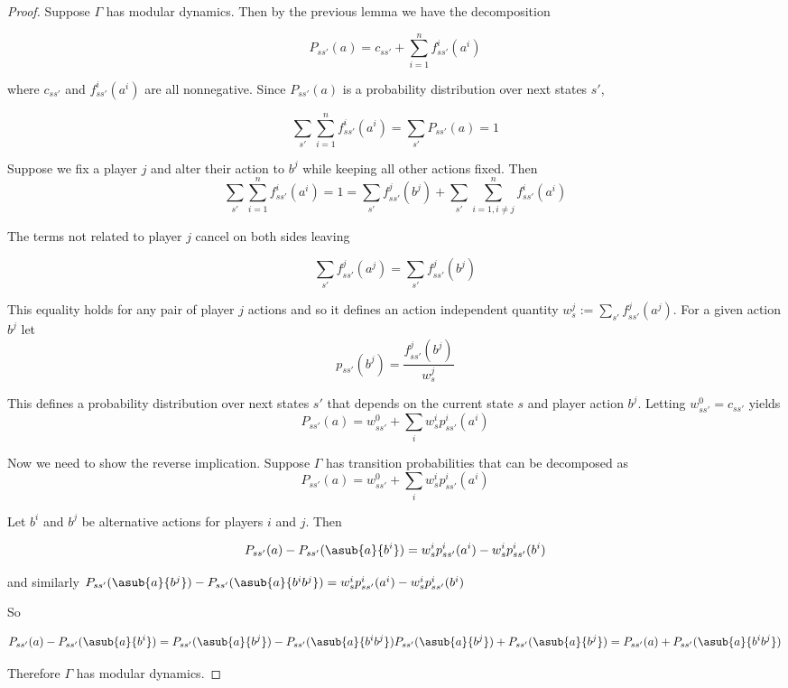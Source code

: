 \begin{proof}

Suppose $\Gamma$ has modular dynamics. Then by the previous lemma we have the decomposition

$$
P_{ss'}(a) = c_{ss'} + \sum_{i=1}^n f^i_{ss'}(a^i)
$$

where $c_{ss'}$ and $f^i_{ss'}(a^i)$ are all nonnegative. Since $P_{ss'}(a)$ is a probability distribution over next states $s'$, 

$$
\sum_{s'} \sum_{i=1}^n f^i_{ss'}(a^i) = \sum_{s'} P_{ss'}(a) = 1
$$

Suppose we fix a player $j$ and alter their action to $b^j$ while keeping all other actions fixed. Then
$$
\sum_{s'} \sum_{i=1}^n f^i_{ss'}(a^i) = 1 = \sum_{s'} f^j_{ss'}(b^j) + \sum_{s'} \sum_{i=1, i \neq j}^n f^i_{ss'}(a^i)
$$

The terms not related to player $j$ cancel on both sides leaving

$$
\sum_{s'} f^j_{ss'}(a^j) = \sum_{s'} f^j_{ss'}(b^j)
$$

This equality holds for any pair of player $j$ actions and so it defines an action independent quantity $w_{s}^j := \sum_{s'} f^j_{ss'}(a^j)$. For a given action $b^j$ let
$$
p_{ss'}(b^j) = \dfrac{f^j_{ss'}(b^j)}{w_s^j}
$$

This defines a probability distribution over next states $s'$ that depends on the current state $s$ and player action $b^j$. Letting $w^0_{ss'} = c_{ss'}$ yields
$$
P_{ss'}(a) = w_{ss'}^0 + \sum_{i} w^i_{s} p^i_{ss'}(a^i)
$$


Now we need to show the reverse implication. Suppose $\Gamma$ has transition probabilities that can be decomposed as
$$
P_{ss'}(a) = w_{ss'}^0 + \sum_{i} w^i_{s} p^i_{ss'}(a^i)
$$

Let $b^i$ and $b^j$ be alternative actions for players $i$ and $j$. Then

$$
P_{ss'}(a) - P_{ss'}(\asub{a}{b^i}) = w^{i}_{s}p^i_{ss'}(a^i) - w^{i}_{s}p^i_{ss'}(b^i)
$$

and similarly
$
P_{ss'}(\asub{a}{b^j}) - P_{ss'}(\asub{a}{b^ib^j}) = w^{i}_{s}p^i_{ss'}(a^i) - w^{i}_{s}p^i_{ss'}(b^i)
$

So

$$
P_{ss'}(a) - P_{ss'}(\asub{a}{b^i}) = P_{ss'}(\asub{a}{b^j}) - P_{ss'}(\asub{a}{b^ib^j}) \\
P_{ss'}(\asub{a}{b^j}) + P_{ss'}(\asub{a}{b^j}) = P_{ss'}(a) + P_{ss'}(\asub{a}{b^ib^j})
$$

Therefore $\Gamma$ has modular dynamics.
\end{proof}




